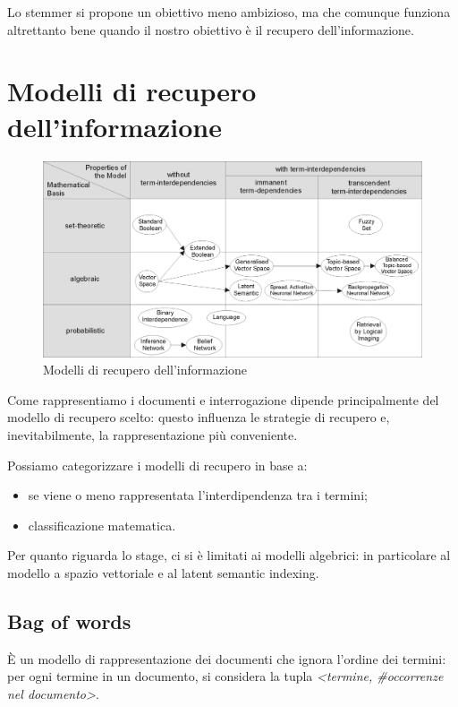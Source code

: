 Lo stemmer si propone un obiettivo meno ambizioso, ma che comunque funziona altrettanto bene quando il nostro obiettivo è il recupero dell'informazione.

\newpage

\section{Modelli di recupero dell'informazione}
\begin{center}
\begin{figure}
    \includegraphics[scale=0.70]{immagini/Information-Retrieval-Models.png}
    \caption{Modelli di recupero dell'informazione}
 \end{figure}
\end{center}
Come rappresentiamo i documenti e interrogazione dipende principalmente del modello di recupero scelto: questo influenza le strategie di recupero e, inevitabilmente, la rappresentazione più conveniente.

Possiamo categorizzare i modelli di recupero in base a:
\begin{itemize}
    \item se viene o meno rappresentata l'interdipendenza tra i termini;
    \item classificazione matematica.
\end{itemize}

Per quanto riguarda lo stage, ci si è limitati ai modelli algebrici: in particolare al modello a spazio vettoriale e al latent semantic indexing.


\subsection{Bag of words}
È un modello di rappresentazione dei documenti che ignora l'ordine dei termini: per ogni termine in un documento, si considera la tupla \textit{<termine, \#occorrenze nel documento>}. 

